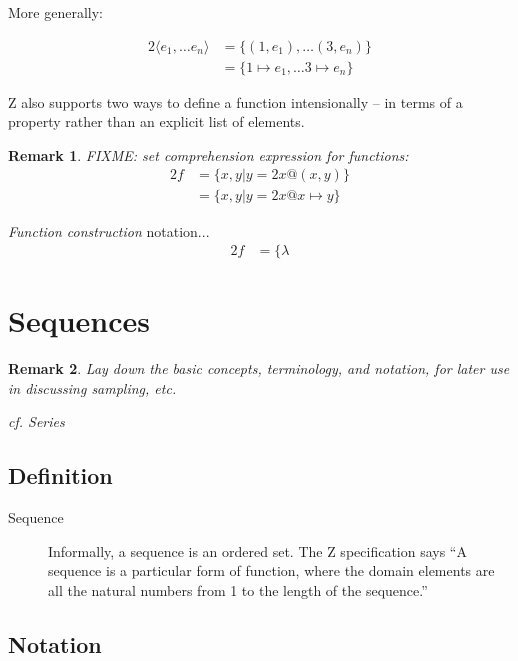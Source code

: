 \documentclass[reqno,12pt]{tufte-book}
\numberwithin{equation}{subsection}
\newtheorem{remark}{Remark}
\begin{document}
\noindent More generally:

\begin{alignat}{2}
  \langle e_1,\ldots e_n\rangle &= \{(1,e_1),\ldots (3,e_n)\} \\
  &= \{1\mapsto e_1,\ldots 3\mapsto e_n\}
\end{alignat}

Z also supports two ways to define a function intensionally -- in
terms of a property rather than an explicit list of elements.

\begin{remark}
FIXME: set comprehension expression for functions:
\begin{alignat}{2}
  f &= \{x,y | y=2x @ (x,y)\} \\
  &= \{x,y | y=2x @ x\mapsto y\}
\end{alignat}
\end{remark}

\textit{Function construction} notation...
\begin{alignat}{2}
  f &= \{\lambda
\end{alignat}


\section{Sequences}
\label{subs:sequences}

\begin{remark}
  Lay down the basic concepts, terminology, and notation, for later
  use in discussing sampling, etc.

  cf. Series
\end{remark}

\subsection{Definition}

\begin{description}
\item [Sequence] Informally, a sequence is an ordered set.  The Z
  specification says ``A sequence is a particular form of function,
  where the domain elements are all the natural numbers from 1 to the
  length of the sequence.''
\end{description}

\subsection{Notation}
\end{document}
